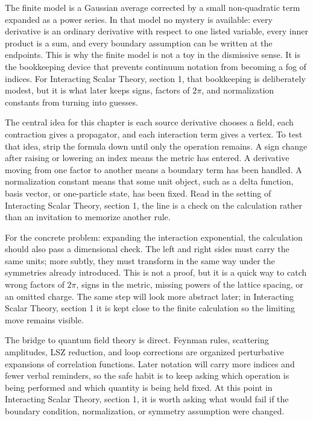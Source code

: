 The finite model is a Gaussian average corrected by a small non-quadratic term expanded as a power series.  In that model no mystery is available: every derivative is an ordinary derivative with respect to one listed variable, every inner product is a sum, and every boundary assumption can be written at the endpoints.  This is why the finite model is not a toy in the dismissive sense.  It is the bookkeeping device that prevents continuum notation from becoming a fog of indices.  For Interacting Scalar Theory, section 1, that bookkeeping is deliberately modest, but it is what later keeps signs, factors of \(2\pi\), and normalization constants from turning into guesses.

The central idea for this chapter is each source derivative chooses a field, each contraction gives a propagator, and each interaction term gives a vertex.  To test that idea, strip the formula down until only the operation remains.  A sign change after raising or lowering an index means the metric has entered.  A derivative moving from one factor to another means a boundary term has been handled.  A normalization constant means that some unit object, such as a delta function, basis vector, or one-particle state, has been fixed.  Read in the setting of Interacting Scalar Theory, section 1, the line is a check on the calculation rather than an invitation to memorize another rule.

For the concrete problem: expanding the interaction exponential, the calculation should also pass a dimensional check.  The left and right sides must carry the same units; more subtly, they must transform in the same way under the symmetries already introduced.  This is not a proof, but it is a quick way to catch wrong factors of \(2\pi\), signs in the metric, missing powers of the lattice spacing, or an omitted charge.  The same step will look more abstract later; in Interacting Scalar Theory, section 1 it is kept close to the finite calculation so the limiting move remains visible.

The bridge to quantum field theory is direct.  Feynman rules, scattering amplitudes, LSZ reduction, and loop corrections are organized perturbative expansions of correlation functions.  Later notation will carry more indices and fewer verbal reminders, so the safe habit is to keep asking which operation is being performed and which quantity is being held fixed.  At this point in Interacting Scalar Theory, section 1, it is worth asking what would fail if the boundary condition, normalization, or symmetry assumption were changed.

